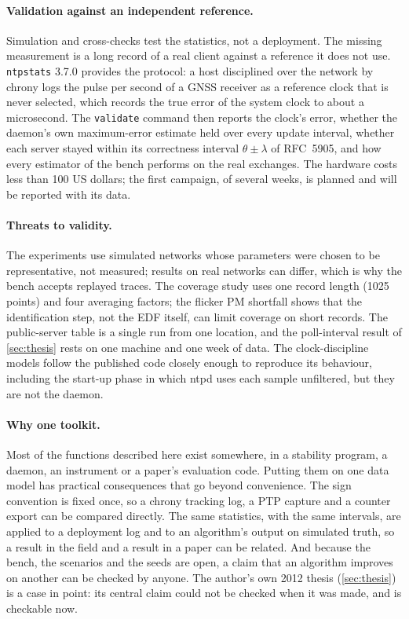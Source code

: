 \documentclass[11pt,a4paper]{article}
\newcommand{\ntp}{\texttt{ntpstats}}
\begin{document}
\paragraph{Validation against an independent reference.} Simulation and cross-checks test the
statistics, not a deployment. The missing measurement is a long record of a real client against a
reference it does not use. \ntp{} 3.7.0 provides the protocol: a host disciplined over the network by
chrony logs the pulse per second of a GNSS receiver as a reference clock that is never selected, which
records the true error of the system clock to about a microsecond. The \texttt{validate} command then
reports the clock's error, whether the daemon's own maximum-error estimate held over every update
interval, whether each server stayed within its correctness interval $\theta \pm \lambda$ of
RFC~5905, and how every estimator of the bench performs on the real exchanges. The hardware costs less
than 100 US dollars; the first campaign, of several weeks, is planned and will be reported with its
data.

\paragraph{Threats to validity.} The experiments use simulated networks whose parameters were chosen to
be representative, not measured; results on real networks can differ, which is why the bench accepts
replayed traces. The coverage study uses one record length (1025 points) and four averaging factors;
the flicker PM shortfall shows that the identification step, not the EDF itself, can limit coverage on
short records. The public-server table is a single run from one location, and the poll-interval
result of \cref{sec:thesis} rests on one machine and one week of data. The clock-discipline models
follow the published code closely enough to reproduce its behaviour, including the start-up phase in
which ntpd uses each sample unfiltered, but they are not the daemon.

\paragraph{Why one toolkit.} Most of the functions described here exist somewhere, in a stability
program, a daemon, an instrument or a paper's evaluation code. Putting them on one data model has
practical consequences that go beyond convenience. The sign convention is fixed once, so a chrony
tracking log, a PTP capture and a counter export can be compared directly. The same statistics, with
the same intervals, are applied to a deployment log and to an algorithm's output on simulated truth, so
a result in the field and a result in a paper can be related. And because the bench, the scenarios and
the seeds are open, a claim that an algorithm improves on another can be checked by anyone. The
author's own 2012 thesis (\cref{sec:thesis}) is a case in point: its central claim could not be checked
when it was made, and is checkable now.
\end{document}
